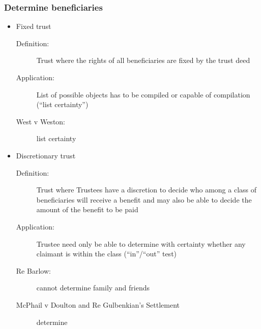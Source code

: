 \subsubsection*{Determine beneficiaries}
\begin{itemize}
    \item Fixed trust
        \begin{description}
            \item[Definition:]Trust where the rights of all beneficiaries are fixed by the trust deed
            \item[Application:]List of possible objects has to be  compiled or capable of compilation (“list certainty”)
            \item[West v Weston:]list certainty
        \end{description}
    \item Discretionary trust
        \begin{description}
            \item[Definition:]Trust where Trustees have a discretion to decide who among a
class of beneficiaries will receive a benefit and may also be able to decide the amount of the benefit to be paid
            \item[Application:]Trustee need only be able to determine with certainty whether any claimant is within the class (“in”/“out” test)
            \item[Re Barlow:]cannot determine family and friends
            \item[McPhail v Doulton and Re Gulbenkian’s Settlement] determine
        \end{description}
\end{itemize}


